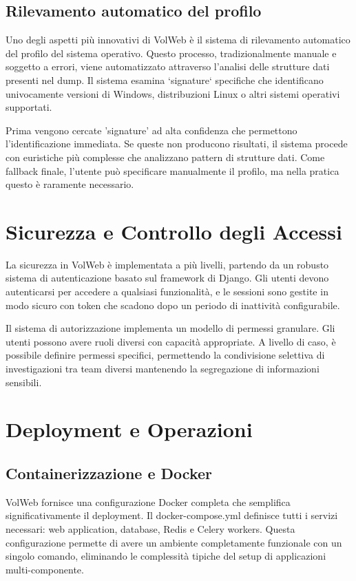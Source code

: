 \subsection{Rilevamento automatico del profilo}

Uno degli aspetti più innovativi di VolWeb è il sistema di rilevamento automatico del profilo del sistema operativo. Questo processo, tradizionalmente manuale e soggetto a errori, viene automatizzato attraverso l'analisi delle strutture dati presenti nel dump. Il sistema esamina `signature` specifiche che identificano univocamente versioni di Windows, distribuzioni Linux o altri sistemi operativi supportati.

Prima vengono cercate 'signature' ad alta confidenza che permettono l'identificazione immediata. Se queste non producono risultati, il sistema procede con euristiche più complesse che analizzano pattern di strutture dati. Come fallback finale, l'utente può specificare manualmente il profilo, ma nella pratica questo è raramente necessario.

\section{Sicurezza e Controllo degli Accessi}

La sicurezza in VolWeb è implementata a più livelli, partendo da un robusto sistema di autenticazione basato sul framework di Django. Gli utenti devono autenticarsi per accedere a qualsiasi funzionalità, e le sessioni sono gestite in modo sicuro con token che scadono dopo un periodo di inattività configurabile.

Il sistema di autorizzazione implementa un modello di permessi granulare. Gli utenti possono avere ruoli diversi con capacità appropriate. A livello di caso, è possibile definire permessi specifici, permettendo la condivisione selettiva di investigazioni tra team diversi mantenendo la segregazione di informazioni sensibili.

\section{Deployment e Operazioni}
\subsection{Containerizzazione e Docker}
VolWeb fornisce una configurazione Docker completa che semplifica significativamente il deployment. Il docker-compose.yml definisce tutti i servizi necessari: web application, database, Redis e Celery workers. Questa configurazione permette di avere un ambiente completamente funzionale con un singolo comando, eliminando le complessità tipiche del setup di applicazioni multi-componente.

